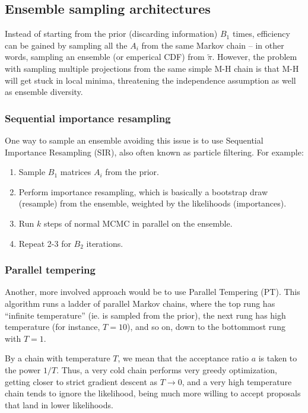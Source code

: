 \documentclass[ejs,preprint]{imsart}
\begin{document}
\subsection{Ensemble sampling architectures}

Instead of starting from the prior (discarding information) $B_1$ times, efficiency can be gained by sampling all the $A_i$ from the same Markov chain -- in other words, sampling an ensemble (or emperical CDF) from $\tilde\pi$. However, the problem with sampling multiple projections from the same simple M-H chain is that M-H will get stuck in local minima, threatening the independence assumption as well as ensemble diversity.

\subsubsection{Sequential importance resampling}

One way to sample an ensemble avoiding this issue is to use Sequential Importance Resampling (SIR), also often known as particle filtering. For example:
\begin{enumerate}
	\item Sample $B_1$ matrices $A_i$ from the prior.
	\item Perform importance resampling, which is basically a bootstrap draw (resample) from the ensemble, weighted by the likelihoods (importances).
	\item Run $k$ steps of normal MCMC in parallel on the ensemble.
	\item Repeat 2-3 for $B_2$ iterations.
\end{enumerate}

\subsubsection{Parallel tempering}

Another, more involved approach would be to use Parallel Tempering (PT). This algorithm runs a ladder of parallel Markov chains, where the top rung has ``infinite temperature'' (ie. is sampled from the prior), the next rung has high temperature (for instance, $T=10$), and so on, down to the bottommost rung with $T=1$.

By a chain with temperature $T$, we mean that the acceptance ratio $a$ is taken to the power $1/T$. Thus, a very cold chain performs very greedy optimization, getting closer to strict gradient descent as $T\to 0$, and a very high temperature chain tends to ignore the likelihood, being much more willing to accept proposals that land in lower likelihoods.
\end{document}
